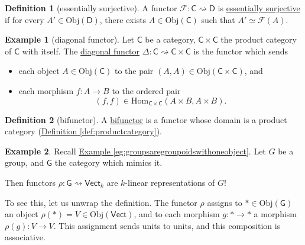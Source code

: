 \documentclass[a4paper,10pt]{scrreprt}
\newcommand{\defn}[1]{\ul{#1}}
\newcommand{\Obj}{\mathrm{Obj}}
\newcommand{\Hom}{\mathrm{Hom}}
\theoremstyle{definition}
\newtheorem{definition}{Definition}[section]
\newtheorem{example}{Example}[section]
\theoremstyle{plain}
\theoremstyle{remark}
\begin{document}
\begin{definition}[essentially surjective]
  \label{def:essentiallysurjective}
  A functor $\mathcal{F}\colon \mathsf{C} \rightsquigarrow \mathsf{D}$ is \defn{essentially surjective} if for every $A' \in \Obj(\mathsf{D})$, there exists $A \in \Obj(\mathsf{C})$ such that $A' \simeq \mathcal{F}(A)$.
\end{definition}

\begin{example}[diagonal functor]
  \label{eg:diagonalfunctor}
  Let $\mathsf{C}$ be a category, $\mathsf{C} \times \mathsf{C}$ the product category of $\mathsf{C}$ with itself. The \defn{diagonal functor} $\Delta\colon \mathsf{C} \rightsquigarrow \mathsf{C} \times \mathsf{C}$ is the functor which sends 
  \begin{itemize}
    \item each object $A \in \Obj(\mathsf{C})$ to the pair $(A,A) \in \Obj(\mathsf{C} \times \mathsf{C})$, and
    \item each morphism $f\colon A \to B$ to the ordered pair 
      \begin{equation*}
        (f,f) \in \Hom_{\mathsf{C}\times\mathsf{C}}(A\times B,A \times B).
      \end{equation*}
  \end{itemize}
\end{example}

\begin{definition}[bifunctor]
  \label{def:bifunctor}
  A \defn{bifunctor} is a functor whose domain is a product category (\hyperref[def:productcategory]{Definition \ref*{def:productcategory}}).
\end{definition}

\begin{example}
  \label{eg:functorscanbegrouprepresentation}
  Recall \hyperref[eg:groupsaregroupoidswithoneobject]{Example \ref*{eg:groupsaregroupoidswithoneobject}}. Let $G$ be a group, and $\mathsf{G}$ the category which mimics it.

  Then functors $\rho\colon \mathsf{G} \rightsquigarrow \mathsf{Vect}_{k}$ are $k$-linear representations of $G$! 

  To see this, let us unwrap the definition. The functor $\rho$ assigns to $* \in \Obj(\mathsf{G})$ an object $\rho(*) = V \in \Obj(\mathsf{Vect})$, and to each morphism $g\colon * \to *$ a morphism $\rho(g)\colon V \to V$. This assignment sends units to units, and this composition is associative.
\end{example}
\end{document}
